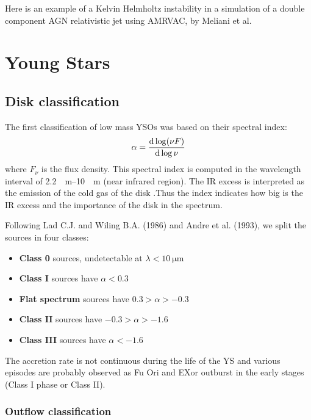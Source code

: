 \documentclass[10pt,a4paper,english]{article}
\begin{document}
Here is an example of a Kelvin Helmholtz instability in a simulation of a double component AGN relativistic jet using AMRVAC, by Meliani et al.


\section{Young Stars}

\subsection{Disk classification}
The first classification of low mass YSOs was based on their spectral index:
\begin{equation}
    \alpha = \frac{\mathrm{d} \log (\nu F)}{\mathrm{d} \log \nu}
\end{equation}
where $F_\nu$ is the flux density.
This spectral index is computed in the wavelength interval of \SIrange{2.2}{10}{\mu\m} (near infrared region). The IR excess is interpreted as the emission of the cold gas of the disk .Thus the index indicates how big is the IR excess and the importance of the disk in the spectrum.


Following Lad C.J. and Wiling B.A. (1986) and Andre et al. (1993), we split the sources in four classes:
\begin{itemize}
    \item \textbf{Class 0} sources, undetectable at $\lambda < \SI{10}{\micro\m}$
    \item \textbf{Class I} sources have $\alpha < 0.3$
    \item \textbf{Flat spectrum} sources have $0.3 > \alpha > -0.3$
    \item \textbf{Class II} sources have $-0.3 > \alpha > -1.6$
    \item \textbf{Class III} sources have $\alpha < -1.6$
\end{itemize}

The accretion rate is not continuous during the life of the YS and various episodes are probably observed as Fu Ori and EXor outburst in the early stages (Class I phase or Class II).


\subsubsection{Outflow classification}
\end{document}
